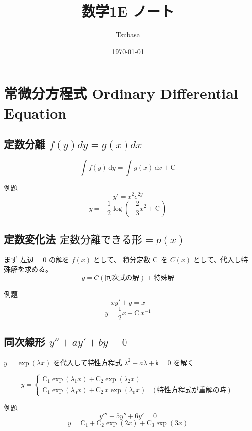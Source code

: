 \documentclass[a4paper]{ltjsarticle}
\newcommand{\C}{\mathrm{C}\,}
\begin{document}
\title{数学1E ノート}
\author{Tsubasa}
\date{\today}
\maketitle

\section{常微分方程式 Ordinary Differential Equation}

\subsection{定数分離 \quad $ f(y)dy = g(x)dx $}

$$ \int f(y) \,\mathrm{d}y = \int g(x) \,\mathrm{d}x + \C $$

例題
$$ y'=x^2e^{2y} $$
$$ y = -\frac{1}{2} \log\left(-\frac{2}{3} x^2 + \C \right) $$


\subsection{定数変化法 \quad $ \mathrm{定数分離できる形} = p(x) $}

まず $ \mathrm{左辺} = 0 $ の解を $ f(x) $ として、
積分定数 $\C$ を $C(x)$ として、代入し特殊解を求める。
$$ y = C (\mathrm{同次式の解}) + \mathrm{特殊解} $$

例題
$$ xy' + y = x $$
$$ y = \frac{1}{2}x + \C x^{-1} $$


\subsection{同次線形 $ y'' + ay' + by  = 0 $}

$ y = \exp(\lambda x) $ を代入して特性方程式 $ \lambda ^2 + a \lambda + b = 0$ を解く

$$ y = \begin{cases}
    \mathrm{C}_1 \exp(\lambda_1 x) + \mathrm{C}_2 \exp(\lambda_2 x) \\
    \mathrm{C}_1 \exp(\lambda_0 x) + \mathrm{C}_2 \, x \exp(\lambda_0 x) & (特性方程式が重解の時)
\end{cases} $$

例題
$$ y''' - 5y'' + 6y' = 0 $$
$$ y = \mathrm{C}_1 + \mathrm{C}_2 \exp(2x) + \mathrm{C}_3 \exp(3x) $$
\end{document}
